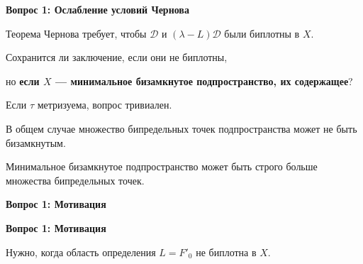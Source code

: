 \documentclass[11pt]{article}
\begin{document}
\newpage

\begin{center}
{\color{notaeYELLOW}\bfseries\fontsize{44}{52}\selectfont Вопрос 1: Ослабление условий Чернова}
\end{center}
\vspace*{\fill}
\begin{center}
\fontsize{36}{43}\selectfont
\parbox{\linewidth}{\centering\noindent Теорема Чернова требует, чтобы $\mathcal{D}$ и $(\lambda-L)\mathcal{D}$ были биплотны в $X$.
\par}\vspace{0.4in}
\parbox{\linewidth}{\centering\noindent Сохранится ли заключение, если они не биплотны,
\par}\vspace{0.4in}
\parbox{\linewidth}{\centering\noindent но \textbf{если $X$ --- минимальное бизамкнутое подпространство, их содержащее}?
\par}\vspace{0.4in}
\parbox{\linewidth}{\centering\noindent Если $\tau$ метризуема, вопрос тривиален.
\par}\vspace{0.4in}
\parbox{\linewidth}{\centering\noindent В общем случае множество бипредельных точек подпространства может не быть бизамкнутым.
\par}\vspace{0.4in}
\parbox{\linewidth}{\centering\noindent Минимальное бизамкнутое подпространство может быть строго больше множества бипредельных точек.
\par}\vspace{0.4in}
\end{center}
\vspace*{\fill}

\newpage

\begin{center}
{\color{notaeYELLOW}\bfseries\fontsize{44}{52}\selectfont Вопрос 1: Мотивация}
\end{center}
\vspace*{\fill}
\begin{center}
\fontsize{36}{43}\selectfont
\end{center}
\vspace*{\fill}

\newpage

\begin{center}
{\color{notaeYELLOW}\bfseries\fontsize{44}{52}\selectfont Вопрос 1: Мотивация}
\end{center}
\vspace*{\fill}
\begin{center}
\fontsize{36}{43}\selectfont
\parbox{\linewidth}{\centering\noindent Нужно, когда область определения $L=F'_0$ не биплотна в $X$.
\par}\vspace{0.4in}
\end{center}
\vspace*{\fill}
\end{document}
